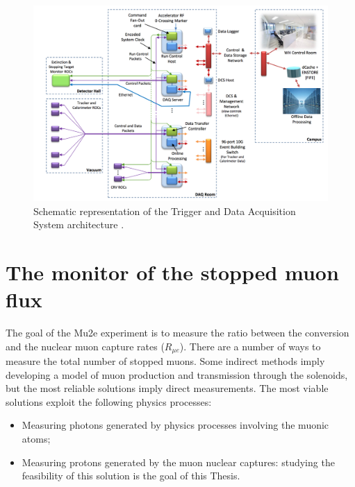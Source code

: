 \documentclass[12pt,a4paper,openright, oneside, titlepage]{book} %
\begin{document}
\begin{figure}[h!]
\centering
\includegraphics[scale=0.6]{TDAQ}
\caption[Trigger and Data Acquisition System]{Schematic representation of the Trigger and Data Acquisition System architecture \cite{TDAQ}.}
\label{_TDAQ}
\end{figure}

\section{The monitor of the stopped muon flux}
The goal of the Mu2e experiment is to measure the ratio between the conversion and the nuclear muon capture rates
($R_{\mu e}$). 
There are a number of ways to measure the total number of stopped muons. 
Some indirect methods imply developing a model
of muon production and transmission through the solenoids, 
but the most reliable solutions imply direct measurements.
The most viable solutions exploit the following physics processes:
\begin{itemize}
\item Measuring photons generated by physics processes involving the muonic atoms;  
\item Measuring protons generated by the muon nuclear captures: 
studying the feasibility of this solution is the goal of this Thesis.
\end{itemize} 
\end{document}
